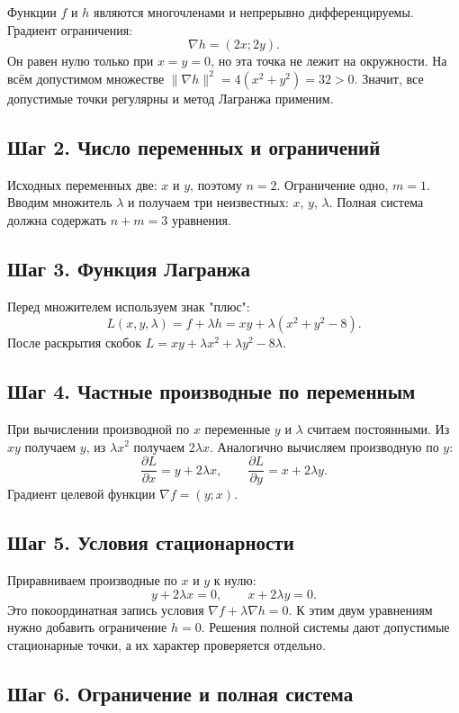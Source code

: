 \documentclass[a4paper,12pt]{article}
\begin{document}
Функции $f$ и $h$ являются многочленами и непрерывно дифференцируемы. Градиент ограничения:
\[
\nabla h=(2x;2y).
\]
Он равен нулю только при $x=y=0$, но эта точка не лежит на окружности. На всём допустимом множестве $\|\nabla h\|^2=4(x^2+y^2)=32>0$. Значит, все допустимые точки регулярны и метод Лагранжа применим.

\subsection*{Шаг 2. Число переменных и ограничений}

Исходных переменных две: $x$ и $y$, поэтому $n=2$. Ограничение одно, $m=1$. Вводим множитель $\lambda$ и получаем три неизвестных: $x$, $y$, $\lambda$. Полная система должна содержать $n+m=3$ уравнения.

\subsection*{Шаг 3. Функция Лагранжа}

Перед множителем используем знак "плюс":
\[
L(x,y,\lambda)=f+\lambda h=xy+\lambda(x^2+y^2-8).
\]
После раскрытия скобок $L=xy+\lambda x^2+\lambda y^2-8\lambda$.

\subsection*{Шаг 4. Частные производные по переменным}

При вычислении производной по $x$ переменные $y$ и $\lambda$ считаем постоянными. Из $xy$ получаем $y$, из $\lambda x^2$ получаем $2\lambda x$. Аналогично вычисляем производную по $y$:
\[
\frac{\partial L}{\partial x}=y+2\lambda x,\qquad
\frac{\partial L}{\partial y}=x+2\lambda y.
\]
Градиент целевой функции $\nabla f=(y;x)$.

\subsection*{Шаг 5. Условия стационарности}

Приравниваем производные по $x$ и $y$ к нулю:
\[
y+2\lambda x=0,\qquad x+2\lambda y=0.
\]
Это покоординатная запись условия $\nabla f+\lambda\nabla h=0$. К этим двум уравнениям нужно добавить ограничение $h=0$. Решения полной системы дают допустимые стационарные точки, а их характер проверяется отдельно.

\subsection*{Шаг 6. Ограничение и полная система}
\end{document}
